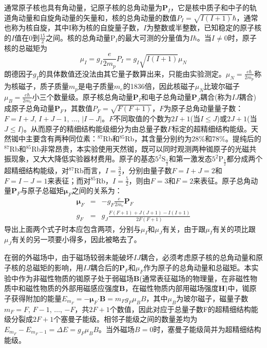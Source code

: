 \documentclass[a4paper]{article}
\begin{document}
通常原子核也具有角动量，记原子核的总角动量为$\bm{P}_I$，它是核中质子和中子的轨道角动量和自旋角动量的矢量和，核的总角动量的数值$P_I=\sqrt{I(I+1)}\hbar$，通常也称为核自旋，其中I称为核的自旋量子数，$I$为整数或半整数，已知稳定的原子核的$I$值在0到$\frac{15}{2}$之间。核的总角动量$\text{P}_I$的最大可测的分量值为$I\hbar$。当$I\neq 0$时，原子核的总磁矩为
\begin{equation*}
\mu_I = g_I\frac{e}{2m_p}P_I = g_I\sqrt{I(I+1)}\mu_N
\end{equation*}
朗德因子$g_I$的具体数值还没法由其它量子数算出来，只能由实验测定。$\mu_N = \frac{e\hbar}{2m_p}$称为核磁子，质子质量$m_p$是电子质量$m_e$的1836倍，因此核磁子$\mu_N$比玻尔磁子$\mu_B = \frac{e\hbar}{2m_e}$小三个数量级。原子核总角动量$\bm{P}_I$和电子总角动量$\bm{P}_J$耦合(称为$IJ$耦合)成原子总角动量$\bm{P}_F$，其数值$P_F = \sqrt{F(F+1)}$，$F$为原子总角动量量子数：$F=I+J$, $I+J-1$, $\dots$, $|I-J|$。$F$不同取值的个数为$2I+1$(当$I\leq J$)或$2J+1$(当$J\leq I$)。从而原子的精细结构能级细分为由总量子数$F$标定的超精细结构能级。天然铷中主要含有两种同位素：$^{87}$Rb和$^{85}$Rb，其含量分别约为28\%和78\%。提纯后的$^{87}$Rb和$^{85}$Rb非常昂贵，本实验使用天然铷，既可以同时观测两种铷原子的光磁共振现象，又大大降低实验器材费用。原子的基态$5^2\text{S}_{\frac{1}{2}}$和第一激发态$5^2\text{P}_{\frac{1}{2}}$都分成两个超精细结构能级，对$^{87}$Rb而言，$I=\frac{3}{2}$，分别由量子数$F=I+J=2$和$F=I-J=1$来表征；而对$^{85}$Rb，$I=\frac{5}{2}$，则由$F=3$和$F=2$来表征。原子总角动量$\bm{P}_F$与原子总磁矩$\bm{\mu}_F$之间的关系为：
\begin{eqnarray}
\bm{\mu}_F &=& -g_F\frac{e}{2m_e}\bm{P}_F\label{eq2}\\
g_F &=& g_J\frac{F(F+1) + J(J+1) - I(I+1)}{2F(F+1)}\label{eq3}
\end{eqnarray}
导出上面两个式子时本应包含两项，分别与$\mu_I$和$\mu_J$有关，由于跟$\mu_I$有关的项比跟$\mu_J$有关的另一项要小得多，因此被略去了。

在弱的外磁场中，由于磁场较弱未能破坏$IJ$耦合，必须考虑原子核的总角动量和原子核的总磁矩的影响，用$IJ$耦合后的$\bm{P}_F$和$\mu_F$作为原子的总角动量和总磁矩。本实验中作为非磁性物质的铷原子处于弱磁场$\bm{B}$(通常表征磁场的物理量，在非磁性物质中和磁性物质的外部用磁感应强度$\bm{B}$，在磁性物质内部用磁场强度$\bm{H}$)中，铷原子获得附加的能量$E_{m_F} = -\bm{\mu}_F\bm{\cdot}\bm{B} = m_Fg_F\mu_BB$，其中$\mu_B$为玻尔磁子，磁量子数$m_F=F$, $F-1$, $\dots$, $-F$，共$2F+1$个数值，因此对应于总量子数F的超精细结构能级分裂成$2F+1$个塞曼子能级。相邻子能级之间的数量差均为$E_{m_F} - E_{m_F-1} = \Delta E = g_F\mu_BB$。当外磁场$B=0$时，塞曼子能级简并为超精细结构能级。
\end{document}
